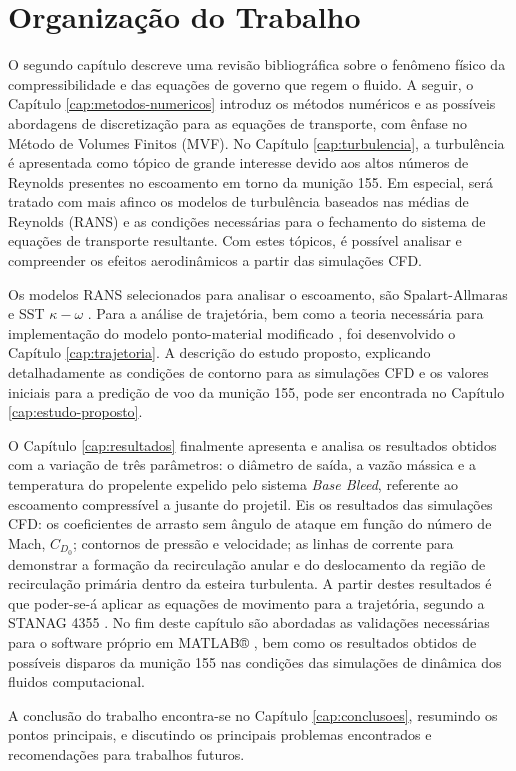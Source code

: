 \section{Organização do Trabalho}

O segundo capítulo descreve uma revisão bibliográfica sobre o fenômeno físico da compressibilidade e das equações de governo que regem o fluido. A seguir, o Capítulo \ref{cap:metodos-numericos} introduz os métodos numéricos e as possíveis abordagens de discretização para as equações de transporte, com ênfase no Método de Volumes Finitos (MVF). No Capítulo \ref{cap:turbulencia}, a turbulência é apresentada como tópico de grande interesse devido aos altos números de Reynolds presentes no escoamento em torno da munição \qty{155}{\millimetre}. Em especial, será tratado com mais afinco os modelos de turbulência baseados nas médias de Reynolds (RANS) e as condições necessárias para o fechamento do sistema de equações de transporte resultante. Com estes tópicos, é possível analisar e compreender os efeitos aerodinâmicos a partir das simulações CFD.

Os modelos RANS selecionados para analisar o escoamento, são Spalart-Allmaras \cite{Spalart1992} e SST \(\kappa-\omega\) \cite{Menter1994TwoequationET,Menter2003,Menter2009}. Para a análise de trajetória, bem como a teoria necessária para implementação do modelo ponto-material modificado \cite{stanag4355}, foi desenvolvido o Capítulo \ref{cap:trajetoria}. A descrição do estudo proposto, explicando detalhadamente as condições de contorno para as simulações CFD e os valores iniciais para a predição de voo da munição \qty{155}{\millimetre}, pode ser encontrada no Capítulo \ref{cap:estudo-proposto}.

O Capítulo \ref{cap:resultados} finalmente apresenta e analisa os resultados obtidos com a variação de três parâmetros: o diâmetro de saída, a vazão mássica e a temperatura do propelente expelido pelo sistema \textit{Base Bleed}, referente ao escoamento compressível a jusante do projetil. Eis os resultados das simulações CFD: os coeficientes de arrasto sem ângulo de ataque em função do número de Mach, \(C_{D_{0}}\); contornos de pressão e velocidade; as linhas de corrente para demonstrar a formação da recirculação anular e do deslocamento da região de recirculação primária dentro da esteira turbulenta. A partir destes resultados é que poder-se-á aplicar as equações de movimento para a trajetória, segundo a STANAG 4355 \cite{stanag4355}. No fim deste capítulo são abordadas as validações necessárias para o software próprio em MATLAB® \cite{ThallyoENCIT2022,Thallyo2022}, bem como os resultados obtidos de possíveis disparos da munição \qty{155}{\millimetre} nas condições das simulações de dinâmica dos fluidos computacional. 

A conclusão do trabalho encontra-se no Capítulo \ref{cap:conclusoes}, resumindo os pontos principais, e discutindo os principais problemas encontrados e recomendações para trabalhos futuros.